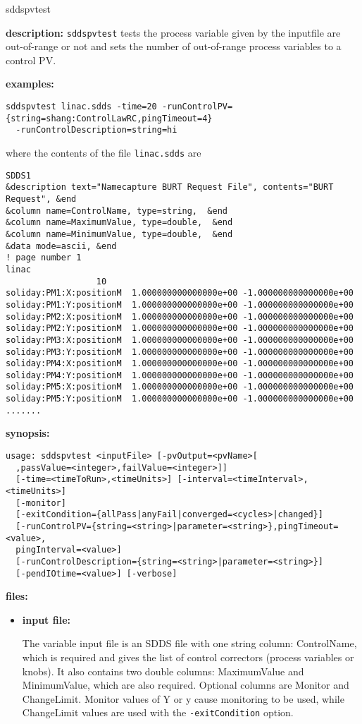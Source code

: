 \begin{sddsprog}{sddspvtest}
\item \textbf{description:}
\verb+sddspvtest+ tests the process variable given by the inputfile are out-of-range
or not and sets the number of out-of-range process variables to a control PV.

\item \textbf{examples:}
\begin{verbatim}
sddspvtest linac.sdds -time=20 -runControlPV={string=shang:ControlLawRC,pingTimeout=4}
  -runControlDescription=string=hi
\end{verbatim}
where the contents of the file \verb+linac.sdds+ are
\begin{verbatim}
SDDS1
&description text="Namecapture BURT Request File", contents="BURT Request", &end
&column name=ControlName, type=string,  &end
&column name=MaximumValue, type=double,  &end
&column name=MinimumValue, type=double,  &end
&data mode=ascii, &end
! page number 1
linac
                  10
soliday:PM1:X:positionM  1.000000000000000e+00 -1.000000000000000e+00
soliday:PM1:Y:positionM  1.000000000000000e+00 -1.000000000000000e+00
soliday:PM2:X:positionM  1.000000000000000e+00 -1.000000000000000e+00
soliday:PM2:Y:positionM  1.000000000000000e+00 -1.000000000000000e+00
soliday:PM3:X:positionM  1.000000000000000e+00 -1.000000000000000e+00
soliday:PM3:Y:positionM  1.000000000000000e+00 -1.000000000000000e+00
soliday:PM4:X:positionM  1.000000000000000e+00 -1.000000000000000e+00
soliday:PM4:Y:positionM  1.000000000000000e+00 -1.000000000000000e+00
soliday:PM5:X:positionM  1.000000000000000e+00 -1.000000000000000e+00
soliday:PM5:Y:positionM  1.000000000000000e+00 -1.000000000000000e+00
.......

\end{verbatim}

\item \textbf{synopsis:}
\begin{verbatim}
usage: sddspvtest <inputFile> [-pvOutput=<pvName>[
  ,passValue=<integer>,failValue=<integer>]]
  [-time=<timeToRun>,<timeUnits>] [-interval=<timeInterval>,<timeUnits>]
  [-monitor]
  [-exitCondition={allPass|anyFail|converged=<cycles>|changed}]
  [-runControlPV={string=<string>|parameter=<string>},pingTimeout=<value>,
  pingInterval=<value>]
  [-runControlDescription={string=<string>|parameter=<string>}]
  [-pendIOtime=<value>] [-verbose]
\end{verbatim}
\item \textbf{files:}
\begin{itemize}
  \item \textbf{input file:} \par
The variable input file is an SDDS file with one string column: ControlName, which is required
and gives the list of control correctors (process variables or knobs). It also contains two
double columns: MaximumValue and MinimumValue, which are also required. Optional columns
are Monitor and ChangeLimit. Monitor values of Y or y cause monitoring to be used, while
ChangeLimit values are used with the \verb|-exitCondition| option.
\end{itemize}


\end{sddsprog}
